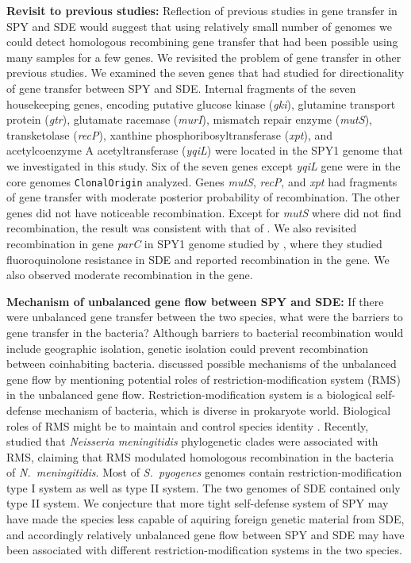 \documentclass[english]{article}
\begin{document}
\textbf{Revisit to previous studies:} 
Reflection of previous studies in gene transfer in SPY and SDE would suggest
that using relatively small number of genomes we could detect homologous
recombining gene transfer that had been possible using many samples for
a few genes. We revisited the problem of gene transfer in other previous
studies.  We examined
the seven genes that \citet{Kalia2001} had studied for directionality
of gene transfer between SPY and SDE. Internal fragments of the seven
housekeeping genes, encoding putative glucose kinase (\textit{gki}),
glutamine transport protein (\textit{gtr}), glutamate racemase (\textit{murI}),
mismatch repair enzyme (\textit{mutS}), transketolase (\textit{recP}),
xanthine phosphoribosyltransferase (\textit{xpt}), and acetylcoenzyme
A acetyltransferase (\textit{yqiL}) were located in the SPY1 genome that we
investigated in this study.  Six of the seven genes except \textit{yqiL
}gene were in the core genomes \texttt{ClonalOrigin} analyzed. Genes \textit{mutS},
\textit{recP}, and \textit{xpt} had fragments of gene transfer with moderate
posterior probability of recombination. The other genes did not have
noticeable recombination. Except for \textit{mutS} where \citet{Kalia2001}
did not find recombination, the result was consistent with that of
\citet{Kalia2001}. 
We also revisited recombination in gene \textit{parC} in SPY1 genome
studied by \citet{Pinho2010}, where they studied fluoroquinolone
resistance in SDE and reported recombination in the gene. We also
observed moderate recombination in the gene. 

\textbf{Mechanism of unbalanced gene flow between SPY and SDE:} 
If there were unbalanced gene transfer between the two
species, what were the barriers \citep{Thomas2005} to gene transfer
in the bacteria? Although barriers to bacterial recombination would
include geographic isolation, genetic isolation could prevent recombination
between coinhabiting bacteria. \citet{Kalia2001} discussed possible
mechanisms of the unbalanced gene flow by mentioning potential roles
of restriction-modification system (RMS) in the unbalanced gene flow.
Restriction-modification system is a biological self-defense mechanism
of bacteria, which is diverse in prokaryote world. Biological roles
of RMS might be to maintain and control species identity \citep{Jeltsch2003}.
Recently, \citet{Budroni2011a} studied that \textit{Neisseria meningitidis}
phylogenetic clades were associated with RMS, claiming that RMS modulated
homologous recombination in the bacteria of \textit{N.\ meningitidis}.
Most of \textit{S.\ pyogenes} genomes contain restriction-modification
type I system as well as type II system. The two genomes of SDE contained
only type II system. We conjecture that more tight self-defense system
of SPY may have made the species less capable of aquiring foreign
genetic material from SDE, and accordingly relatively unbalanced gene
flow between SPY and SDE may have been associated with different 
restriction-modification systems in the two species.
\end{document}
